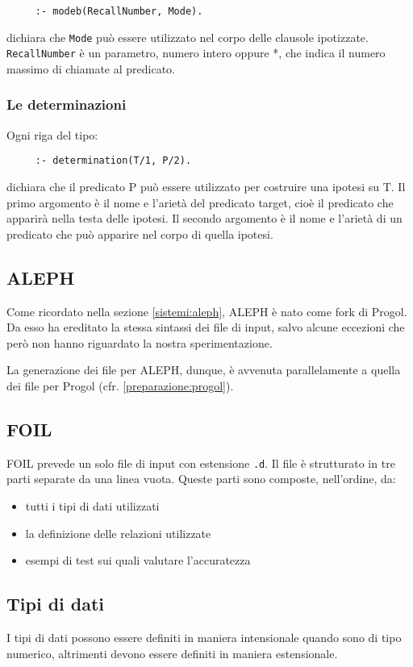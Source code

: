 \begin{verbatim}
     :- modeb(RecallNumber, Mode).
\end{verbatim}
dichiara che \verb+Mode+ può essere utilizzato nel corpo delle clausole ipotizzate. \verb+RecallNumber+ è un parametro, numero intero oppure *, che indica il numero massimo di chiamate al predicato.

\subsubsection*{Le determinazioni}
Ogni riga del tipo:
\begin{verbatim}
     :- determination(T/1, P/2).
\end{verbatim}
dichiara che il predicato P può essere utilizzato per costruire una ipotesi su T.
Il primo argomento è il nome e l'arietà del predicato target, cioè il predicato che apparirà nella testa delle ipotesi. Il secondo argomento è il nome e l'arietà di un predicato che può apparire nel corpo di quella ipotesi.

\subsection{ALEPH}
Come ricordato nella sezione \ref{sistemi:aleph}, ALEPH è nato come fork di Progol. Da esso ha ereditato la stessa sintassi dei file di input, salvo alcune eccezioni che però non hanno riguardato la nostra sperimentazione.

La generazione dei file per ALEPH, dunque, è avvenuta parallelamente a quella dei file per Progol (cfr. \ref{preparazione:progol}).


\subsection{FOIL}
FOIL prevede un solo file di input con estensione \verb+.d+.
Il file è strutturato in tre
parti separate da una linea vuota. Queste parti sono composte, nell'ordine, da:
\begin{itemize}
\item tutti i tipi di dati utilizzati
\item la definizione delle relazioni utilizzate
\item esempi di test sui quali valutare l'accuratezza
\end{itemize}

\subsection{Tipi di dati}
I tipi di dati possono essere definiti in maniera
intensionale quando sono di tipo numerico, altrimenti devono essere definiti in maniera estensionale. 

